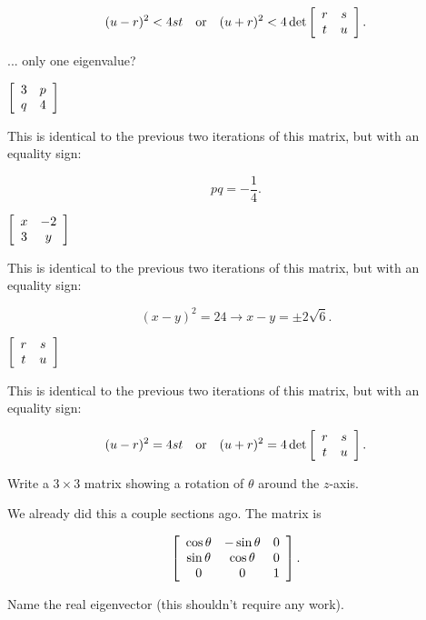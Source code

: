 \documentclass[../key.tex]{subfiles}
\begin{document}
$$(u-r)^2 < 4st \quad\text{or}\quad (u+r)^2 < 4\det \left[\begin{array}{cc} r & s \\ t & u \end{array}\right].$$

\begin{inner_problem}
\item ... only one eigenvalue?
\end{inner_problem}

\begin{iinner_problem}[start=1]
\item $\left[\begin{array}{cc} 3 & p \\ q & 4 \end{array}\right]$
\end{iinner_problem}

This is identical to the previous two iterations of this matrix, but with an equality sign:

$$pq = -\frac{1}{4}.$$

\begin{iinner_problem}
\item $\left[\begin{array}{cc} x & -2 \\ 3 & y \end{array}\right]$
\end{iinner_problem}

This is identical to the previous two iterations of this matrix, but with an equality sign:

$$(x-y)^2 = 24 \rightarrow x-y = \pm 2\sqrt{6}.$$

\begin{iinner_problem}
\item $\left[\begin{array}{cc} r & s \\ t & u \end{array}\right]$
\end{iinner_problem}

This is identical to the previous two iterations of this matrix, but with an equality sign:

$$(u-r)^2 = 4st \quad\text{or}\quad (u+r)^2 = 4\det \left[\begin{array}{cc} r & s \\ t & u \end{array}\right].$$

\begin{outer_problem}
\item
\end{outer_problem}

\begin{inner_problem}[start=1]
\item Write a $3\times 3$ matrix showing a rotation of $\theta$ around the $z$-axis.
\end{inner_problem}

We already did this a couple sections ago. The matrix is

$$\left[\begin{array}{ccc} \cos\theta & -\sin\theta & 0 \\ \sin\theta & \cos\theta & 0 \\ 0 & 0 & 1 \end{array}\right].$$

\begin{inner_problem}
\item Name the real eigenvector (this shouldn't require any work).
\end{inner_problem}
\end{document}
